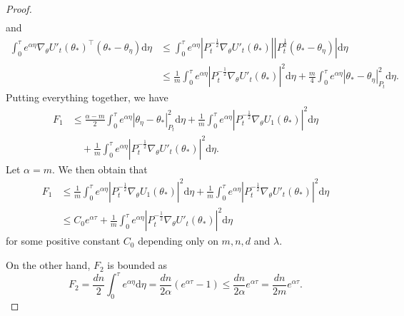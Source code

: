 \documentclass[11pt]{article}
\theoremstyle{plain}
\theoremstyle{definition}
\theoremstyle{remark}
\begin{document}
\begin{proof}
\begin{equation*}
\begin{split}
\end{split}
\end{equation*}
and
\begin{equation*}
\begin{split}
    \int_0^\tau e^{\alpha \eta} \nabla_{\theta} U'_t(\theta_*)^{\top}(\theta_*-\theta_\eta)\mathrm{d}\eta &\leq \int_0^\tau e^{\alpha \eta}|P_t^{-\frac{1}{2}}\nabla_{\theta} U'_t(\theta_*)||P_t^{\frac{1}{2}}(\theta_*-\theta_\eta)|\mathrm{d}\eta\\
    & \leq \frac{1}{m}\int_0^\tau e^{\alpha \eta}|P_t^{-\frac{1}{2}}\nabla_{\theta} U'_t(\theta_*)|^2 \mathrm{d}\eta +\frac{m}{4}\int_0^\tau e^{\alpha \eta}|\theta_*-\theta_\eta|_{P_t}^2 \mathrm{d}\eta.
\end{split}
\end{equation*}
Putting everything together, we have
\begin{align*}
F_1 &\leq \frac{\alpha-m}{2}\int_0^\tau e^{\alpha \eta}|\theta_\eta-\theta_*|_{P_t}^2 \mathrm{d}\eta +\frac{1}{m} \int_0^\tau e^{\alpha \eta} |P_t^{-\frac{1}{2}}\nabla_{\theta} U_1(\theta_*)|^2\mathrm{d}\eta\\
&\quad +\frac{1}{m} \int_0^\tau e^{\alpha \eta} |P_t^{-\frac{1}{2}}\nabla_{\theta} U'_t(\theta_*)|^2\mathrm{d}\eta.
\end{align*}
Let $\alpha = m$. We then obtain that
\begin{align*}
F_1 &\leq \frac{1}{m} \int_0^\tau e^{\alpha \eta} |P_t^{-\frac{1}{2}}\nabla_{\theta} U_1(\theta_*)|^2\mathrm{d}\eta +\frac{1}{m}\int_0^\tau e^{\alpha \eta}|P_t^{-\frac{1}{2}}\nabla_{\theta} U'_t(\theta_*)|^2 \mathrm{d}\eta\\
& \leq C_0 e^{\alpha \tau}+\frac{1}{m}\int_0^\tau e^{\alpha \eta}|P_t^{-\frac{1}{2}}\nabla_{\theta} U'_t(\theta_*)|^2 \mathrm{d}\eta
\end{align*}
for some positive constant $C_0$ depending only on $m, n, d$ and $\lambda$. 

On the other hand, $F_2$ is bounded as 
\[
F_2 = \frac{dn}{2}\int_0^\tau e^{\alpha \eta}\mathrm{d}\eta = \frac{dn}{2\alpha}(e^{\alpha \tau}-1) \leq \frac{dn}{2\alpha}e^{\alpha \tau} = \frac{dn}{2m}e^{\alpha \tau}.
\]


\end{proof}
\end{document}
